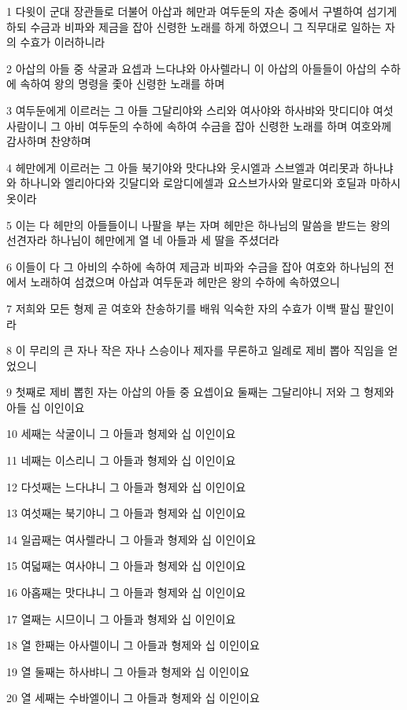 \par 1 다윗이 군대 장관들로 더불어 아삽과 헤만과 여두둔의 자손 중에서 구별하여 섬기게 하되 수금과 비파와 제금을 잡아 신령한 노래를 하게 하였으니 그 직무대로 일하는 자의 수효가 이러하니라
\par 2 아삽의 아들 중 삭굴과 요셉과 느다냐와 아사렐라니 이 아삽의 아들들이 아삽의 수하에 속하여 왕의 명령을 좇아 신령한 노래를 하며
\par 3 여두둔에게 이르러는 그 아들 그달리야와 스리와 여사야와 하사뱌와 맛디디야 여섯 사람이니 그 아비 여두둔의 수하에 속하여 수금을 잡아 신령한 노래를 하며 여호와께 감사하며 찬양하며
\par 4 헤만에게 이르러는 그 아들 북기야와 맛다냐와 웃시엘과 스브엘과 여리못과 하나냐와 하나니와 엘리아다와 깃달디와 로암디에셀과 요스브가사와 말로디와 호딜과 마하시옷이라
\par 5 이는 다 헤만의 아들들이니 나팔을 부는 자며 헤만은 하나님의 말씀을 받드는 왕의 선견자라 하나님이 헤만에게 열 네 아들과 세 딸을 주셨더라
\par 6 이들이 다 그 아비의 수하에 속하여 제금과 비파와 수금을 잡아 여호와 하나님의 전에서 노래하여 섬겼으며 아삽과 여두둔과 헤만은 왕의 수하에 속하였으니
\par 7 저희와 모든 형제 곧 여호와 찬송하기를 배워 익숙한 자의 수효가 이백 팔십 팔인이라
\par 8 이 무리의 큰 자나 작은 자나 스승이나 제자를 무론하고 일례로 제비 뽑아 직임을 얻었으니
\par 9 첫째로 제비 뽑힌 자는 아삽의 아들 중 요셉이요 둘째는 그달리야니 저와 그 형제와 아들 십 이인이요
\par 10 세째는 삭굴이니 그 아들과 형제와 십 이인이요
\par 11 네째는 이스리니 그 아들과 형제와 십 이인이요
\par 12 다섯째는 느다냐니 그 아들과 형제와 십 이인이요
\par 13 여섯째는 북기야니 그 아들과 형제와 십 이인이요
\par 14 일곱째는 여사렐라니 그 아들과 형제와 십 이인이요
\par 15 여덟째는 여사야니 그 아들과 형제와 십 이인이요
\par 16 아홉째는 맛다냐니 그 아들과 형제와 십 이인이요
\par 17 열째는 시므이니 그 아들과 형제와 십 이인이요
\par 18 열 한째는 아사렐이니 그 아들과 형제와 십 이인이요
\par 19 열 둘째는 하사뱌니 그 아들과 형제와 십 이인이요
\par 20 열 세째는 수바엘이니 그 아들과 형제와 십 이인이요
